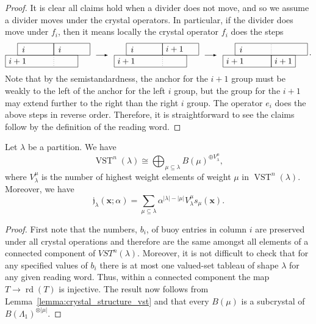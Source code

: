 \documentclass[ALCO,ThmDefs,Unicode,epreuves]{cedram}
\newcommand{\dwG}{\mathfrak{j}}  %
\newcommand{\xx}{\mathbf{x}}
\newcommand{\iso}{\cong}
\newcommand{\abs}[1]{\lvert #1 \rvert}
\DeclareMathOperator{\rd}{rd} %
\DeclareMathOperator{\vst}{VST} %
\begin{document}
\begin{proof}
It is clear all claims hold when a divider does not move, and so we assume a divider moves under the crystal operators.
In particular, if the divider does move under $f_i$, then it means locally the crystal operator $f_i$ does the steps
\[
\begin{tikzpicture}[scale=0.5,>=latex,baseline=0]
\draw[-] (0,0) rectangle (3,1);
\draw[-] (3,0) rectangle (6,1);
\draw[-] (-1,0) rectangle (5,-1);
\draw[dotted] (3,0) -- (3,-1);
\draw (0,0) node[anchor=north] {$i+1$};
\draw (0.5,0) node[anchor=south] {$i$};
\draw (3.5,0) node[anchor=south] {$i$};
\draw[->] (6.5,0) -- (7.5,0);
\begin{scope}[xshift=9cm]
\draw[-] (0,0) rectangle (3,1);
\draw[-] (3,0) rectangle (6,1);
\draw[-] (-1,0) rectangle (5,-1);
\draw[dotted] (3,0) -- (3,-1);
\draw (0,0) node[anchor=north] {$i+1$};
\draw (0.5,0) node[anchor=south] {$i$};
\draw (4,0) node[anchor=south] {$i+1$};
\end{scope}
\draw[->] (15.5,0) -- (16.5,0);
\begin{scope}[xshift=18cm]
\draw[-] (0,0) rectangle (6,1);
\draw[-] (-1,0) rectangle (3,-1);
\draw[-] (3,0) rectangle (5,-1);
\draw[dotted] (3,0) -- (3,1);
\draw (0,0) node[anchor=north] {$i+1$};
\draw (0.5,0) node[anchor=south] {$i$};
\draw (4,0) node[anchor=north] {$i+1$};
\end{scope}
\end{tikzpicture}\,.
\]
Note that by the semistandardness, the anchor for the $i+1$ group must be weakly to the left of the anchor for the left $i$ group, but the group for the $i+1$ may extend further to the right than the right $i$ group.
The operator $e_i$ does the above steps in reverse order.
Therefore, it is straightforward to see the claims follow by the definition of the reading word.
\end{proof}

\begin{theo}
\label{thm:vst_crystal}
Let $\lambda$ be a partition. We have
\[
\vst^n(\lambda) \iso \bigoplus_{\mu \subseteq \lambda} B(\mu)^{\oplus V_{\lambda}^{\mu}},
\]
where $V_{\lambda}^{\mu}$ is the number of highest weight elements of weight $\mu$ in $\vst^n(\lambda)$. Moreover, we have
\[
\dwG_{\lambda}(\xx; \alpha) = \sum_{\mu \subseteq \lambda} \alpha^{\abs{\lambda} - \abs{\mu}} V_{\lambda}^{\mu} s_{\mu}(\xx).
\]
\end{theo}

\begin{proof}
First note that the  numbers, $b_i$, of  buoy entries in column $i$ are preserved under all crystal operations and therefore are the same amongst all elements of a connected component of $VST^n(\lambda)$.  Moreover, it is not difficult to check that for any specified values of $b_i$ there is at most one valued-set tableau of shape $\lambda$ for any given reading word.  Thus, within a connected component the map $T \to \rd(T)$ is injective.  The result now follows from Lemma~\ref{lemma:crystal_structure_vst} and that every $B(\mu)$ is a subcrystal of $B(\Lambda_1)^{\otimes \abs{\mu}}$.
\end{proof}
\end{document}
